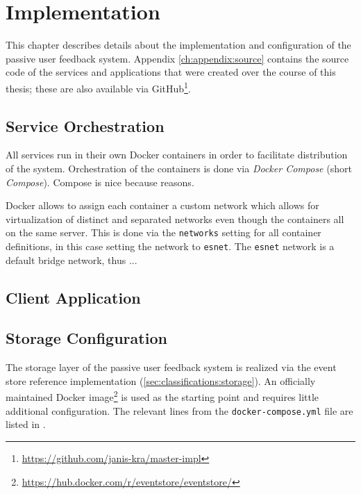 %
\chapter{Implementation}
\label{ch:implementation}

This chapter describes details about the implementation and configuration of the passive user feedback system.
Appendix \cref{ch:appendix:source} contains the source code of the services and applications that were created over the course of this thesis; these are also available via GitHub\footnote{\url{https://github.com/janis-kra/master-impl}}.

\section{Service Orchestration}
\label{sec:implementation:orchestration}

All services run in their own Docker containers in order to facilitate distribution of the system.
Orchestration of the containers is done via \emph{Docker Compose} (short \emph{Compose}).
Compose is nice because reasons.

Docker allows to assign each container a custom network which allows for virtualization of distinct and separated networks even though the containers all on the same server.
This is done via the \texttt{networks} setting for all container definitions, in this case setting the network to \texttt{esnet}.
The \texttt{esnet} network is a default bridge network, thus ...

\section{Client Application}
\label{sec:implementation:client}

\section{Storage Configuration}
\label{sec:implementation:storage}

The storage layer of the passive user feedback system is realized via the event store reference implementation (\cref{sec:classifications:storage}).
An officially maintained Docker image\footnote{\url{https://hub.docker.com/r/eventstore/eventstore/}} is used as the starting point and requires little additional configuration.
The relevant lines from the \texttt{docker-compose.yml} file are listed in .

